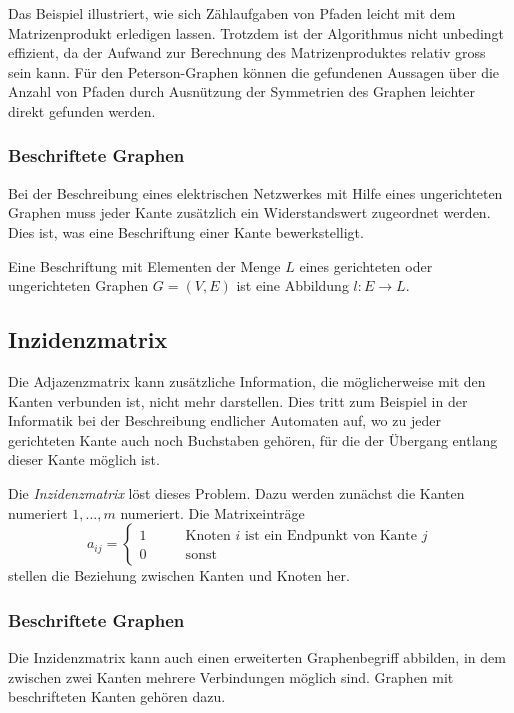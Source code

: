 Das Beispiel illustriert, wie sich Zählaufgaben von Pfaden leicht mit dem
Matrizenprodukt erledigen lassen.
Trotzdem ist der Algorithmus nicht unbedingt effizient, da der Aufwand
zur Berechnung des Matrizenproduktes relativ gross sein kann.
Für den Peterson-Graphen können die gefundenen Aussagen über die Anzahl
von Pfaden durch Ausnützung der Symmetrien des Graphen leichter direkt
gefunden werden.

\subsubsection{Beschriftete Graphen}
Bei der Beschreibung eines elektrischen Netzwerkes mit Hilfe eines
ungerichteten Graphen muss jeder Kante zusätzlich ein Widerstandswert
zugeordnet werden.
Dies ist, was eine Beschriftung einer Kante bewerkstelligt.

\begin{definition}
Eine Beschriftung mit Elementen der Menge $L$
eines gerichteten oder ungerichteten Graphen $G=(V,E)$ 
ist eine Abbildung $l\colon E\to L$.
\end{definition}

\subsection{Inzidenzmatrix}
Die Adjazenzmatrix kann zusätzliche Information, die möglicherweise
mit den Kanten verbunden ist, nicht mehr darstellen.
Dies tritt zum Beispiel in der Informatik bei der Beschreibung
endlicher Automaten auf, wo zu jeder gerichteten Kante auch noch
Buchstaben gehören, für die der Übergang entlang dieser Kante
möglich ist.

Die {\em Inzidenzmatrix} löst dieses Problem.
Dazu werden zunächst die Kanten numeriert $1,\dots,m$
numeriert.
Die Matrixeinträge
\[
a_{ij} = \begin{cases}
1\qquad&\text{Knoten $i$ ist ein Endpunkt von Kante $j$}
\\
0\qquad&\text{sonst}
\end{cases}
\]
stellen die Beziehung zwischen Kanten und Knoten her.

\subsubsection{Beschriftete Graphen}
Die Inzidenzmatrix kann auch einen erweiterten Graphenbegriff abbilden,
in dem zwischen zwei Kanten mehrere Verbindungen möglich sind.
Graphen mit beschrifteten Kanten gehören dazu.

